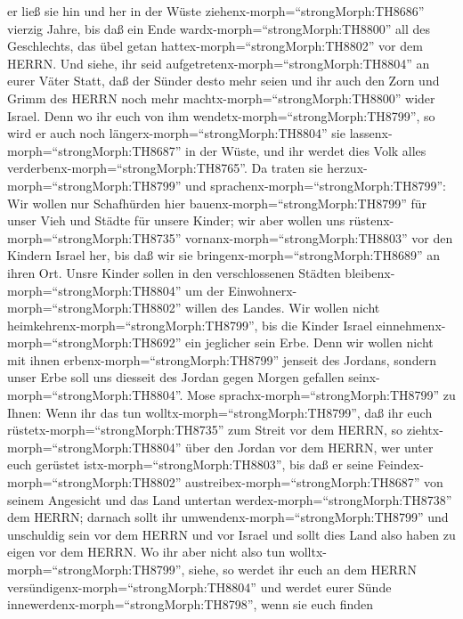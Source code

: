 er ließ sie hin und her in der Wüste
ziehenx-morph=``strongMorph:TH8686'' vierzig Jahre, bis daß ein Ende
wardx-morph=``strongMorph:TH8800'' all des Geschlechts, das übel getan
hattex-morph=``strongMorph:TH8802'' vor dem HERRN.  Und
siehe, ihr seid aufgetretenx-morph=``strongMorph:TH8804'' an eurer Väter
Statt, daß der Sünder desto mehr seien und ihr auch den Zorn und Grimm
des HERRN noch mehr machtx-morph=``strongMorph:TH8800'' wider Israel.
 Denn wo ihr euch von ihm
wendetx-morph=``strongMorph:TH8799'', so wird er auch noch
längerx-morph=``strongMorph:TH8804'' sie
lassenx-morph=``strongMorph:TH8687'' in der Wüste, und ihr werdet dies
Volk alles verderbenx-morph=``strongMorph:TH8765''.  Da
traten sie herzux-morph=``strongMorph:TH8799'' und
sprachenx-morph=``strongMorph:TH8799'': Wir wollen nur Schafhürden hier
bauenx-morph=``strongMorph:TH8799'' für unser Vieh und Städte für unsere
Kinder;  wir aber wollen uns
rüstenx-morph=``strongMorph:TH8735''
vornanx-morph=``strongMorph:TH8803'' vor den Kindern Israel her, bis daß
wir sie bringenx-morph=``strongMorph:TH8689'' an ihren Ort. Unsre Kinder
sollen in den verschlossenen Städten
bleibenx-morph=``strongMorph:TH8804'' um der
Einwohnerx-morph=``strongMorph:TH8802'' willen des Landes. 
Wir wollen nicht heimkehrenx-morph=``strongMorph:TH8799'', bis die
Kinder Israel einnehmenx-morph=``strongMorph:TH8692'' ein jeglicher sein
Erbe.  Denn wir wollen nicht mit ihnen
erbenx-morph=``strongMorph:TH8799'' jenseit des Jordans, sondern unser
Erbe soll uns diesseit des Jordan gegen Morgen gefallen
seinx-morph=``strongMorph:TH8804''.  Mose
sprachx-morph=``strongMorph:TH8799'' zu Ihnen: Wenn ihr das tun
wolltx-morph=``strongMorph:TH8799'', daß ihr euch
rüstetx-morph=``strongMorph:TH8735'' zum Streit vor dem HERRN,
 so ziehtx-morph=``strongMorph:TH8804'' über den Jordan vor
dem HERRN, wer unter euch gerüstet istx-morph=``strongMorph:TH8803'',
bis daß er seine Feindex-morph=``strongMorph:TH8802''
austreibex-morph=``strongMorph:TH8687'' von seinem Angesicht
 und das Land untertan werdex-morph=``strongMorph:TH8738''
dem HERRN; darnach sollt ihr umwendenx-morph=``strongMorph:TH8799'' und
unschuldig sein vor dem HERRN und vor Israel und sollt dies Land also
haben zu eigen vor dem HERRN.  Wo ihr aber nicht also tun
wolltx-morph=``strongMorph:TH8799'', siehe, so werdet ihr euch an dem
HERRN versündigenx-morph=``strongMorph:TH8804'' und werdet eurer Sünde
innewerdenx-morph=``strongMorph:TH8798'', wenn sie euch finden

